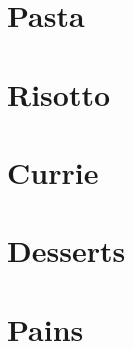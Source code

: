 \documentclass[twosides, 11pt]{book}
\begin{document}
\maketitle
\tableofcontents

\chapter{Pasta}


\chapter{Risotto}


\chapter{Currie}


\chapter{Desserts}




\chapter{Pains}




\clearpage
\printindex
\end{document}
